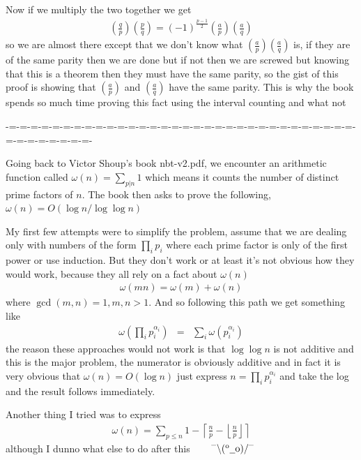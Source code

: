 \documentclass[aps,preprint,preprintnumbers,nofootinbib,showpacs,prd]{revtex4-1}
\newcommand{\nbea}{\begin{eqnarray*}}
\newcommand{\neea}{\end{eqnarray*}}
\newcommand{\dunno}{$ {}^{\mbox {--}}\backslash(^{\rm o}{}\underline{\hspace{0.2cm}}{\rm o})/^{\mbox {--}}$}
\begin{document}
Now if we multiply the two together we get
%
\nbea
\left(\frac{q}{p}\right)\left(\frac{p}{q}\right) = (-1)^{\frac{p-1}{2}} \left(\frac{a}{p}\right) \left(\frac{a}{q}\right)
\neea
%
so we are almost there except that we don't know what $\left(\frac{a}{p}\right) \left(\frac{a}{q}\right)$ is, if they are of the same parity then we are done but if not then we are screwed but knowing that this is a theorem then they must have the same parity, so the gist of this proof is showing that $\left(\frac{a}{p}\right)$ and $\left(\frac{a}{q}\right)$ have the same parity. This is why the book spends so much time proving this fact using the interval counting and what not

-=-=-=-=-=-=-=-=-=-=-=-=-=-=-=-=-=-=-=-=-=-=-=-=-=-=-=-=-=-=-=-=-=-=-=-=-=-=-=-=-

Going back to Victor Shoup's book nbt-v2.pdf, we encounter an arithmetic function called $\omega(n) = \sum_{p|n}1$ which means it counts the number of distinct prime factors of $n$. The book then asks to prove the following, $\omega(n) = O(\log n/\log \log n)$

My first few attempts were to simplify the problem, assume that we are dealing only with numbers of the form $\prod_i p_i$ where each prime factor is only of the first power or use induction. But they don't work or at least it's not obvious how they would work, because they all rely on a fact about $\omega(n)$
%
\nbea
\omega(mn) = \omega(m) + \omega(n)
\neea
%
where $\gcd(m,n) = 1, m,n > 1$. And so following this path we get something like
%
\nbea
\omega\left(\prod_i p_i^{\alpha_i}\right) & = & \sum_i \omega(p_i^{\alpha_i})
\neea
%
the reason these approaches would not work is that $\log \log n$ is not additive and this is the major problem, the numerator is obviously additive and in fact it is very obvious that $\omega(n) = O(\log n)$ just express $n = \prod_i p_i^{\alpha_i}$ and take the log and the result follows immediately.

Another thing I tried was to express 
%
\nbea
\omega(n) = \sum_{p \le n} 1 - \left \lceil \frac{n}{p} - \left \lfloor \frac{n}{p}\right \rfloor \right \rceil 
\neea
%
although I dunno what else to do after this ~~~ \dunno
\end{document}
